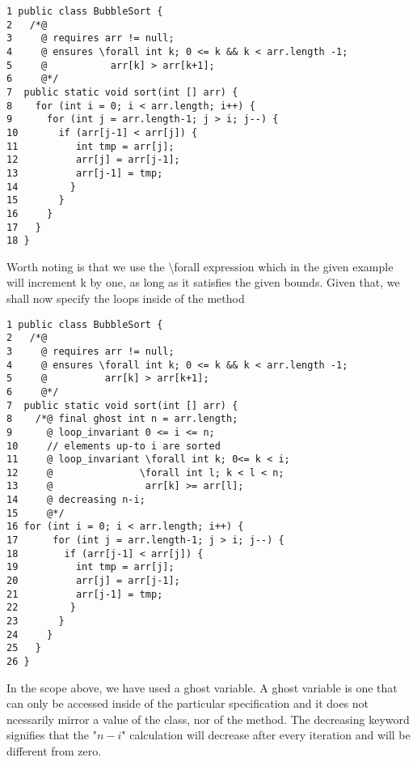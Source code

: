 \documentclass{article}
\begin{document}
\begin{lstlisting}[columns=fixed, basewidth=0.5em, basicstyle={\ttfamily}]
1 public class BubbleSort {    
2   /*@
3     @ requires arr != null; 
4     @ ensures \forall int k; 0 <= k && k < arr.length -1;
5     @           arr[k] > arr[k+1];
6     @*/
7  public static void sort(int [] arr) {        
8    for (int i = 0; i < arr.length; i++) {
9      for (int j = arr.length-1; j > i; j--) {
10       if (arr[j-1] < arr[j]) {
11          int tmp = arr[j];
12          arr[j] = arr[j-1];
13          arr[j-1] = tmp;
14         }
15       }
16     }
17   }
18 }
\end{lstlisting}
Worth noting is that we use the \textbackslash forall expression which in the given example will increment k by one, as long as it satisfies the given bounds. Given that, we shall now specify the loops inside of the method
\begin{lstlisting}[columns=fixed, basewidth=0.5em, basicstyle={\ttfamily}]
1 public class BubbleSort {    
2   /*@
3     @ requires arr != null; 
4     @ ensures \forall int k; 0 <= k && k < arr.length -1;
5     @          arr[k] > arr[k+1];
6     @*/
7  public static void sort(int [] arr) {        
8    /*@ final ghost int n = arr.length;   
9      @ loop_invariant 0 <= i <= n;
10     // elements up-to i are sorted
11     @ loop_invariant \forall int k; 0<= k < i; 
12     @               \forall int l; k < l < n; 
13     @                arr[k] >= arr[l];
14     @ decreasing n-i;
15     @*/
16 for (int i = 0; i < arr.length; i++) {
17      for (int j = arr.length-1; j > i; j--) {
18        if (arr[j-1] < arr[j]) {
19          int tmp = arr[j];
20          arr[j] = arr[j-1];
21          arr[j-1] = tmp;
22         }
23       }
24     }
25   }
26 }
\end{lstlisting}
In the scope above, we have used a ghost variable. A ghost variable is one that can only be accessed inside of the particular specification and it does not ncessarily mirror a value of the class, nor of the method. The decreasing keyword signifies that the "$n-i$" calculation will decrease after every iteration and will be different from zero.
\end{document}
